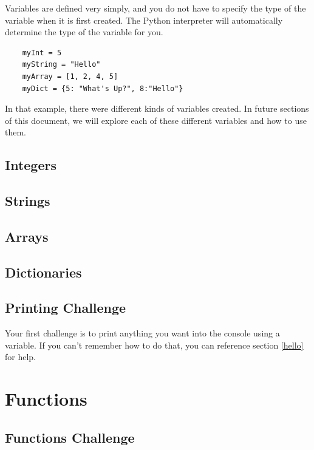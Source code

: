 \documentclass[12pt, letterpaper]{article}
\begin{document}
    Variables are defined very simply, and you do not have to specify the type of the variable when it is first created. The Python interpreter will automatically determine the type of the variable for you.

    \begin{verbatim}
    myInt = 5
    myString = "Hello"
    myArray = [1, 2, 4, 5]
    myDict = {5: "What's Up?", 8:"Hello"}
    \end{verbatim}

    In that example, there were different kinds of variables created. In future sections of this document, we will explore each of these different variables and how to use them.

    \subsection{Integers} \label{integers}

    

    \subsection{Strings} \label{strings}

    \subsection{Arrays} \label{arrays}
    
    \subsection{Dictionaries} \label{dictionaries}

    \subsection{Printing Challenge} \label{hellochallenge}
    
    Your first challenge is to print anything you want into the console using a variable. If you can't remember how to do that, you can reference section \ref{hello} for help.

    \section{Functions} \label{functions}

    \subsection{Functions Challenge} \label{functionschallenge}
\end{document}
